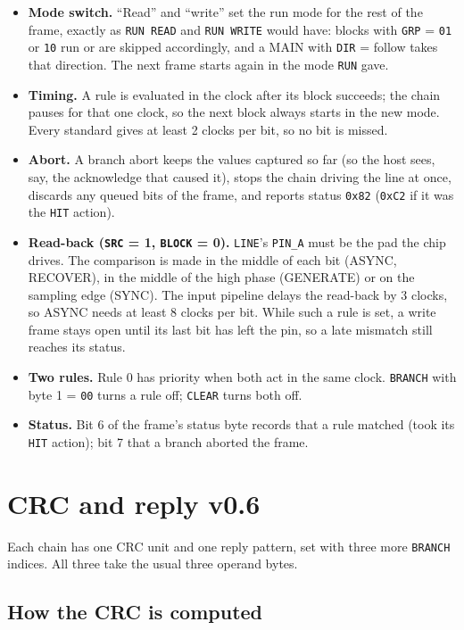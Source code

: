 \documentclass[11pt,a4paper]{article}
\newcommand{\vsix}{\textcolor{sixc}{\textsf{\small v0.6}}}
\newcommand{\sig}[1]{\texttt{#1}}
\begin{document}
\begin{itemize}
\item \textbf{Mode switch.} ``Read'' and ``write'' set the run mode for the rest of the frame, exactly as \sig{RUN READ} and \sig{RUN WRITE} would have: blocks with \sig{GRP} = \texttt{01} or \texttt{10} run or are skipped accordingly, and a MAIN with \sig{DIR} = follow takes that direction. The next frame starts again in the mode \sig{RUN} gave.
\item \textbf{Timing.} A rule is evaluated in the clock after its block succeeds; the chain pauses for that one clock, so the next block always starts in the new mode. Every standard gives at least 2 clocks per bit, so no bit is missed.
\item \textbf{Abort.} A branch abort keeps the values captured so far (so the host sees, say, the acknowledge that caused it), stops the chain driving the line at once, discards any queued bits of the frame, and reports status \texttt{0x82} (\texttt{0xC2} if it was the \sig{HIT} action).
\item \textbf{Read-back (\sig{SRC} = 1, \sig{BLOCK} = 0).} \sig{LINE}'s \sig{PIN\_A} must be the pad the chip drives. The comparison is made in the middle of each bit (ASYNC, RECOVER), in the middle of the high phase (GENERATE) or on the sampling edge (SYNC). The input pipeline delays the read-back by 3 clocks, so ASYNC needs at least 8 clocks per bit. While such a rule is set, a write frame stays open until its last bit has left the pin, so a late mismatch still reaches its status.
\item \textbf{Two rules.} Rule 0 has priority when both act in the same clock. \sig{BRANCH} with byte 1 = \texttt{00} turns a rule off; \sig{CLEAR} turns both off.
\item \textbf{Status.} Bit 6 of the frame's status byte records that a rule matched (took its \sig{HIT} action); bit 7 that a branch aborted the frame.
\end{itemize}

\section{CRC and reply \vsix}\label{sec:crc}

Each chain has one CRC unit and one reply pattern, set with three more \sig{BRANCH} indices. All three take the usual three operand bytes.

\subsection{How the CRC is computed}
\end{document}
